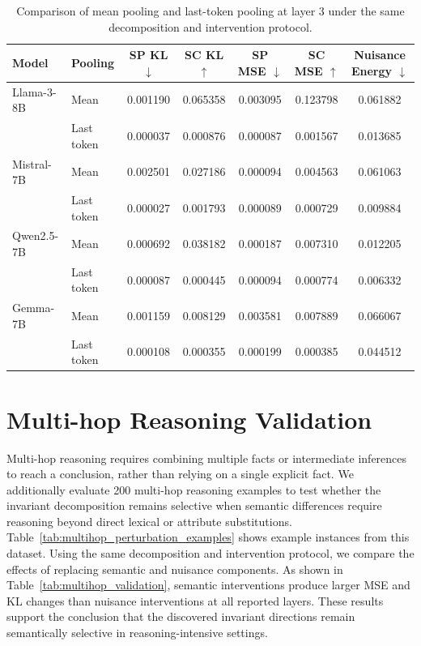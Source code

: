 \begin{table}[!htbp]
\centering
\small
\setlength{\tabcolsep}{4pt}
\renewcommand{\arraystretch}{1.15}
\begin{tabular}{llccccc}
\toprule
Model & Pooling
& SP KL $\downarrow$
& SC KL $\uparrow$
& SP MSE $\downarrow$
& SC MSE $\uparrow$
& Nuisance Energy $\downarrow$ \\
\midrule
Llama-3-8B & Mean
& 0.001190 & 0.065358 & 0.003095 & 0.123798 & 0.061882 \\
& Last token
& 0.000037 & 0.000876 & 0.000087 & 0.001567 & 0.013685 \\
\midrule
Mistral-7B & Mean
& 0.002501 & 0.027186 & 0.000094 & 0.004563 & 0.061063 \\
& Last token
& 0.000027 & 0.001793 & 0.000089 & 0.000729 & 0.009884 \\
\midrule
Qwen2.5-7B & Mean
& 0.000692 & 0.038182 & 0.000187 & 0.007310 & 0.012205 \\
& Last token
& 0.000087 & 0.000445 & 0.000094 & 0.000774 & 0.006332 \\
\midrule
Gemma-7B & Mean
& 0.001159 & 0.008129 & 0.003581 & 0.007889 & 0.066067 \\
& Last token
& 0.000108 & 0.000355 & 0.000199 & 0.000385 & 0.044512 \\
\bottomrule
\end{tabular}
\vspace{0.4em}
\caption{Comparison of mean pooling and last-token pooling at layer 3 under the same decomposition and intervention protocol.}
\label{tab:pooling_comparison}
\vspace{-1.0em}
\end{table}


\section{Multi-hop Reasoning Validation}
\label{app:multihop}

Multi-hop reasoning requires combining multiple facts or intermediate inferences to reach a conclusion, rather than relying on a single explicit fact. We additionally evaluate 200 multi-hop reasoning examples to test whether the invariant decomposition remains selective when semantic differences require reasoning beyond direct lexical or attribute substitutions. Table~\ref{tab:multihop_perturbation_examples} shows example instances from this dataset. Using the same decomposition and intervention protocol, we compare the effects of replacing semantic and nuisance components. As shown in Table~\ref{tab:multihop_validation}, semantic interventions produce larger MSE and KL changes than nuisance interventions at all reported layers. These results support the conclusion that the discovered invariant directions remain semantically selective in reasoning-intensive settings.

